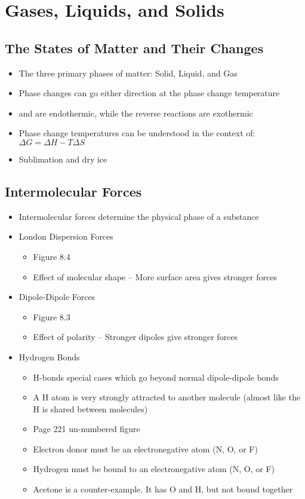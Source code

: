 \documentclass[12pt, openany, letterpaper]{memoir}
\begin{document}
\chapter{Gases, Liquids, and Solids}
\section{The States of Matter and Their Changes}
\begin{itemize}
	\item The three primary phases of matter: Solid, Liquid, and Gas
	\item Phase changes can go either direction at the phase change temperature
	\item {} and  are endothermic, while the reverse reactions are exothermic
	\item Phase change temperatures can be understood in the context of: $\Delta G = \Delta H - T\Delta S$
	\item Sublimation and dry ice
\end{itemize}
\section{Intermolecular Forces}
\begin{itemize}
	\item Intermolecular forces determine the physical phase of a substance
	\item London Dispersion Forces
	      \begin{itemize}
		      \item Figure 8.4
		      \item Effect of molecular shape -- More surface area gives stronger forces
	      \end{itemize}
	\item Dipole-Dipole Forces
	      \begin{itemize}
		      \item Figure 8.3
		      \item Effect of polarity -- Stronger dipoles give stronger forces
	      \end{itemize}
	\item Hydrogen Bonds
	      \begin{itemize}
		      \item H-bonds special cases which go beyond normal dipole-dipole bonds
		      \item A H atom is very strongly attracted to another molecule (almost like the H is shared between molecules)
		      \item Page 221 un-numbered figure
		      \item Electron donor must be an electronegative atom (N, O, or F)
		      \item Hydrogen must be bound to an electronegative atom (N, O, or F)
		      \item Acetone is a counter-example. It has O and H, but not bound together
	      \end{itemize}
\end{itemize}
\end{document}
